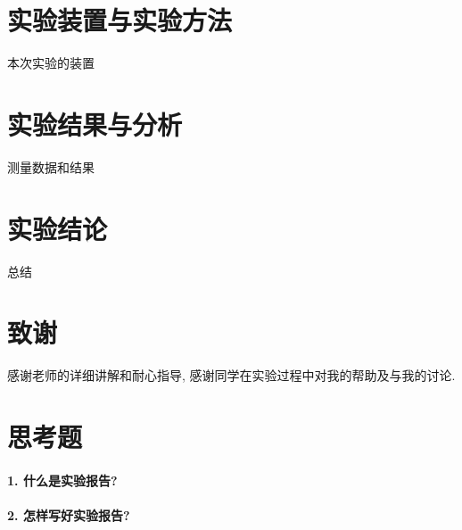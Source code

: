 \documentclass[a4paper,UTF8]{ctexart}
\begin{document}
\section{实验装置与实验方法}
本次实验的装置

\section{实验结果与分析}
测量数据和结果

\section{实验结论}
总结

\section{致谢}
感谢老师的详细讲解和耐心指导, 感谢同学在实验过程中对我的帮助及与我的讨论.




\clearpage
\appendix
\section{思考题}
\paragraph{1. 什么是实验报告?}
\paragraph{2. 怎样写好实验报告?}

\end{document}
